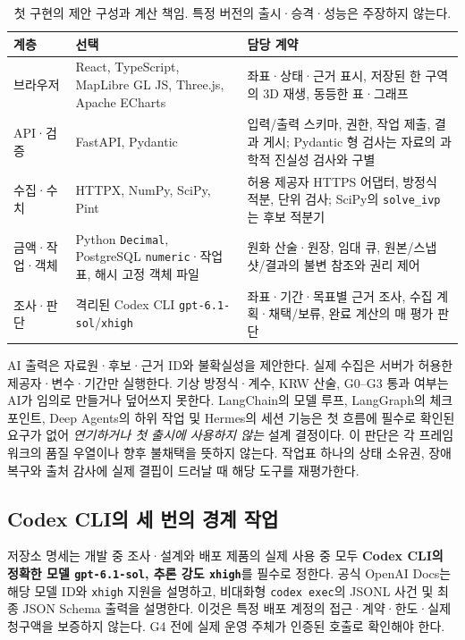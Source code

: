 \documentclass[11pt,a4paper]{article}
\begin{document}
\begin{table}[htbp]
\centering\small
\caption{첫 구현의 제안 구성과 계산 책임. 특정 버전의 출시·승격·성능은 주장하지 않는다.}
\label{tab:stack}
\begin{tabularx}{\textwidth}{p{2.5cm}p{4.1cm}Y}
\toprule
계층 & 선택 & 담당 계약 \\
\midrule
브라우저 & React, TypeScript, MapLibre GL JS, Three.js, Apache ECharts & 좌표·상태·근거 표시, 저장된 한 구역의 3D 재생, 동등한 표·그래프 \\
API·검증 & FastAPI, Pydantic & 입력/출력 스키마, 권한, 작업 제출, 결과 게시; Pydantic 형 검사는 자료의 과학적 진실성 검사와 구별 \\
수집·수치 & HTTPX, NumPy, SciPy, Pint & 허용 제공자 HTTPS 어댑터, 방정식 적분, 단위 검사; SciPy의 \texttt{solve\_ivp}는 후보 적분기\cite{scipy-ivp} \\
금액·작업·객체 & Python \texttt{Decimal}, PostgreSQL \texttt{numeric}·작업표, 해시 고정 객체 파일 & 원화 산술·원장, 임대 큐, 원본/스냅샷/결과의 불변 참조와 권리 제어 \\
조사·판단 & 격리된 Codex CLI \texttt{gpt-6.1-sol}/\texttt{xhigh} & 좌표·기간·목표별 근거 조사, 수집 계획·채택/보류, 완료 계산의 매 평가 판단 \\
\bottomrule
\end{tabularx}
\end{table}

AI 출력은 자료원·후보·근거 ID와 불확실성을 제안한다. 실제 수집은 서버가 허용한 제공자·변수·기간만 실행한다. 기상 방정식·계수, KRW 산술, G0--G3 통과 여부는 AI가 임의로 만들거나 덮어쓰지 못한다. LangChain의 모델 루프, LangGraph의 체크포인트, Deep Agents의 하위 작업 및 Hermes의 세션 기능은 첫 흐름에 필수로 확인된 요구가 없어 \emph{연기하거나 첫 출시에 사용하지 않는} 설계 결정이다. 이 판단은 각 프레임워크의 품질 우열이나 향후 불채택을 뜻하지 않는다. 작업표 하나의 상태 소유권, 장애 복구와 출처 감사에 실제 결핍이 드러날 때 해당 도구를 재평가한다.

\subsection{Codex CLI의 세 번의 경계 작업}
저장소 명세는 개발 중 조사·설계와 배포 제품의 실제 사용 중 모두 \textbf{Codex CLI의 정확한 모델 \texttt{gpt-6.1-sol}, 추론 강도 \texttt{xhigh}}를 필수로 정한다. 공식 OpenAI Docs는 해당 모델 ID와 \texttt{xhigh} 지원을 설명하고, 비대화형 \texttt{codex exec}의 JSONL 사건 및 최종 JSON Schema 출력을 설명한다\cite{openai-model,openai-exec}. 이것은 특정 배포 계정의 접근·계약·한도·실제 청구액을 보증하지 않는다. G4 전에 실제 운영 주체가 인증된 호출로 확인해야 한다.
\end{document}
